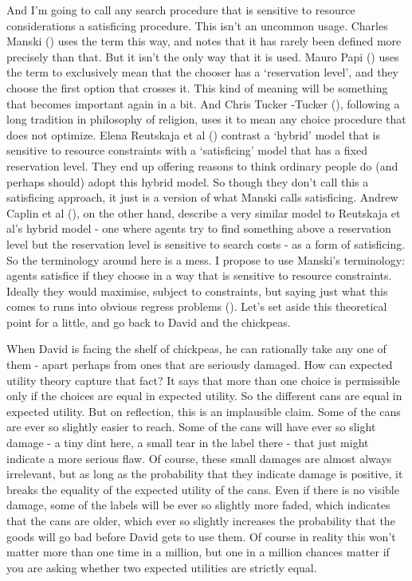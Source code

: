 \documentclass[
  12pt,
  letterpaper,
]{scrbook}
\begin{document}
And I'm going to call any search procedure that is sensitive to resource
considerations a satisficing procedure. This isn't an uncommon usage.
Charles Manski () uses the term this way,
and notes that it has rarely been defined more precisely than that. But
it isn't the only way that it is used. Mauro Papi
() uses the term to exclusively mean that
the chooser has a `reservation level', and they choose the first option
that crosses it. This kind of meaning will be something that becomes
important again in a bit. And Chris Tucker -Tucker
(), following a long tradition in
philosophy of religion, uses it to mean any choice procedure that does
not optimize. Elena Reutskaja et al ()
contrast a `hybrid' model that is sensitive to resource constraints with
a `satisficing' model that has a fixed reservation level. They end up
offering reasons to think ordinary people do (and perhaps should) adopt
this hybrid model. So though they don't call this a satisficing
approach, it just is a version of what Manski calls satisficing. Andrew
Caplin et al (), on the other hand,
describe a very similar model to Reutskaja et al's hybrid model - one
where agents try to find something above a reservation level but the
reservation level is sensitive to search costs - as a form of
satisficing. So the terminology around here is a mess. I propose to use
Manski's terminology: agents satisfice if they choose in a way that is
sensitive to resource constraints. Ideally they would maximise, subject
to constraints, but saying just what this comes to runs into obvious
regress problems (). Let's set
aside this theoretical point for a little, and go back to David and the
chickpeas.

When David is facing the shelf of chickpeas, he can rationally take any
one of them - apart perhaps from ones that are seriously damaged. How
can expected utility theory capture that fact? It says that more than
one choice is permissible only if the choices are equal in expected
utility. So the different cans are equal in expected utility. But on
reflection, this is an implausible claim. Some of the cans are ever so
slightly easier to reach. Some of the cans will have ever so slight
damage - a tiny dint here, a small tear in the label there - that just
might indicate a more serious flaw. Of course, these small damages are
almost always irrelevant, but as long as the probability that they
indicate damage is positive, it breaks the equality of the expected
utility of the cans. Even if there is no visible damage, some of the
labels will be ever so slightly more faded, which indicates that the
cans are older, which ever so slightly increases the probability that
the goods will go bad before David gets to use them. Of course in
reality this won't matter more than one time in a million, but one in a
million chances matter if you are asking whether two expected utilities
are strictly equal.
\end{document}

